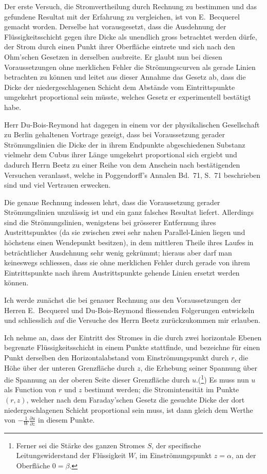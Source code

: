 \documentclass[12pt,a4paper]{book}
\theoremstyle{definition}
\theoremstyle{remark}
\begin{document}
Der erste Versuch, die Stromvertheilung durch Rechnung zu bestimmen und das gefundene Resultat mit der Erfahrung zu vergleichen, ist von E.~Becquerel gemacht worden. Derselbe hat vorausgesetzt, dass die Ausdehnung der Flüssigkeitsschicht gegen ihre Dicke als unendlich gross betrachtet werden dürfe, der Strom durch einen Punkt ihrer Oberfläche eintrete und sich nach den Ohm'schen Gesetzen in derselben ausbreite. Er glaubt nun bei diesen Voraussetzungen ohne merklichen Fehler die Strömungscurven als gerade Linien betrachten zu können und leitet aus dieser Annahme das Gesetz ab, dass die Dicke der niedergeschlagenen Schicht dem Abstände vom Eintrittspunkte umgekehrt proportional sein müsste, welches Gesetz er experimentell bestätigt habe.

Herr Du-Bois-Reymond hat dagegen in einem vor der physikalischen Gesellschaft zu Berlin gehaltenen Vortrage gezeigt, dass bei Voraussetzung gerader Strömungslinien die Dicke der in ihrem Endpunkte abgeschiedenen Substanz vielmehr dem Cubus ihrer Länge umgekehrt proportional sich ergiebt und dadurch Herrn Beetz zu einer Reihe von dem Anschein nach bestätigenden Versuchen veranlasst, welche in Poggendorff's Annalen Bd.~71, S.~71 beschrieben sind und viel Vertrauen erwecken.

Die genaue Rechnung indessen lehrt, dass die Voraussetzung gerader Strömungslinien unzulässig ist und ein ganz falsches Resultat liefert. Allerdings sind die Strömungslinien, wenigstens bei grösserer Entfernung ihres Austrittspunktes (da sie zwischen zwei sehr nahen Parallel-Linien liegen und höchstens einen Wendepunkt besitzen), in dem mittleren Theile ihres Laufes in beträchtlicher Ausdehnung sehr wenig gekrümmt; hieraus aber darf man keineswegs schliessen, dass sie ohne merklichen Fehler durch gerade von ihrem Eintrittspunkte nach ihrem Austrittspunkte gehende Linien ersetzt werden können.

Ich werde zunächst die bei genauer Rechnung aus den Voraussetzungen der Herren E.~Becquerel und Du-Bois-Reymond fliessenden Folgerungen entwickeln und schliesslich auf die Versuche des Herrn Beetz zurückzukommen mir erlauben.

Ich nehme an, dass der Eintritt des Stromes in die durch zwei horizontale Ebenen begrenzte Flüssigkeitsschicht in einem Punkte stattfinde, und bezeichne für einen Punkt derselben den Horizontalabstand vom Einströmungspunkt durch $r$, die Höhe über der unteren Grenzfläche durch $z$, die Erhebung seiner Spannung über die Spannung an der oberen Seite dieser Grenzfläche durch $u$.(\footnote{Ferner sei die Stärke des ganzen Stromes $S$, der specifische Leitungswiderstand der Flüssigkeit $W$, im Einströmungspunkt $z = \alpha$, an der Oberfläche $0 = \beta$.}) Es muss nun $u$ als Function von $r$ und $z$ bestimmt werden; die Stromintensität im Punkte $(r, z)$, welcher nach dem Faraday'schen Gesetz die gesuchte Dicke der dort niedergeschlagenen Schicht proportional sein muss, ist dann gleich dem Werthe von $-\frac{1}{W}\frac{\partial u}{\partial z}$ in diesem Punkte.
\end{document}
